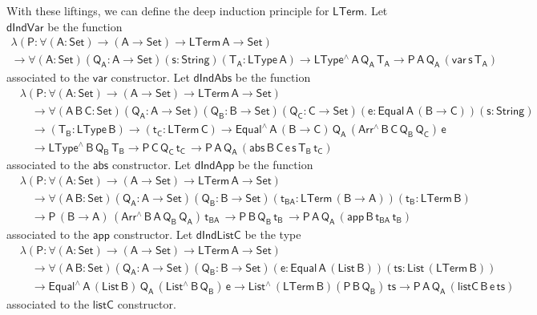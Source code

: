 \documentclass[9pt]{entcs} \usepackage{entcsmacro}
\begin{document}
With these liftings, we can define the deep induction principle for $\mathsf{LTerm}$.
Let $\mathsf{dIndVar}$ be the function 
\begin{multline*}
\mathsf{\lambda (P : \forall (A : Set) \to (A \to Set) \to LTerm\,A \to Set)} \\
\mathsf{\to 
  \forall (A : Set) (Q_A : A \to Set) (s : String) (T_A : LType\, A) 
  \to LType^{\wedge} \, A\, Q_A\, T_A
  \to P \, A\, Q_A\, (var \, s\, T_A)
  }
\end{multline*}
associated to the $\mathsf{var}$ constructor. 
Let $\mathsf{dIndAbs}$ be the function 
\begin{align*}
  &\mathsf{\lambda (P : \forall (A : Set) \to (A \to Set) \to LTerm\,A \to Set)} \\
  &\quad\mathsf{\to 
  \forall (A\,B\,C: Set) (Q_A : A \to Set)  (Q_B : B \to Set) (Q_C : C \to Set)
  (e : Equal\, A\, (B \to C)) (s : String) } \\ 
  &\quad\mathsf{ \to (T_B : LType\, B) \to (t_C : LTerm\, C)
  \to Equal^{\wedge}\,A\,(B \to C)\, Q_A \, (Arr^{\wedge} \, B\, C\, Q_B \, Q_C) \, e
  } \\
  &\quad\mathsf{
  \to LType^{\wedge}\, B\, Q_B\, T_B
  \to P\, C\, Q_C\, t_C\, 
  \to P \, A\, Q_A\, (abs \,B \,C \, e \,s \,T_B \, t_C)
  }
\end{align*}
associated to the $\mathsf{abs}$ constructor. 
Let $\mathsf{dIndApp}$ be the function 
\begin{align*}
  &\mathsf{\lambda (P : \forall (A : Set) \to (A \to Set) \to LTerm\,A \to Set)} \\
  &\quad \mathsf{\to 
  \forall (A \,B : Set) (Q_A : A \to Set)  (Q_B : B \to Set) 
   (t_{BA} : LTerm\, (B \to A)) (t_B : LTerm\, B)} \\
  &\quad \mathsf{
  \to P\, (B \to A)\, (Arr^{\wedge} \, B\, A\, Q_B \, Q_A) \, t_{BA} \, 
  \to P\, B\, Q_B\, t_B\, 
  \to P \, A\, Q_A\, (app \,B \,t_{BA} \, t_B) }
\end{align*}
associated to the $\mathsf{app}$ constructor. 
Let $\mathsf{dIndListC}$ be the type 
\begin{align*}
  &\mathsf{\lambda (P : \forall (A : Set) \to (A \to Set) \to LTerm\,A \to Set)} \\
  &\quad \mathsf{\to 
  \forall (A \,B : Set) (Q_A : A \to Set)  (Q_B : B \to Set) 
    (e : Equal\, A\, (List\, B)) (ts : List\, (LTerm\, B))} \\ 
  &\quad \mathsf{
    \to Equal^{\wedge}\, A\, (List\,B)\, Q_A\, (List^{\wedge}\, B\, Q_B)\, e 
  \to List^{\wedge}\, (LTerm\,B) (P\, B\, Q_B)\, ts
  \to P \, A\, Q_A\, (listC \,B \,e \, ts) }
\end{align*}
associated to the $\mathsf{listC}$ constructor.
\end{document}
